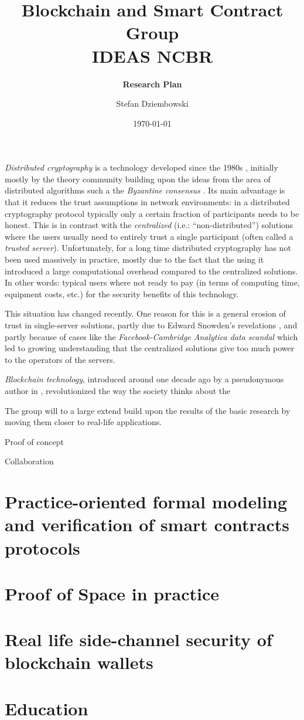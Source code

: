 \documentclass{article}
\title{\textbf{Blockchain and Smart Contract Group\\ IDEAS NCBR}}
\subtitle{\textbf{Research Plan}}
\date{\today}
\author{Stefan Dziembowski}
\begin{document}
	
\maketitle


\emph{Distributed cryptography} is a technology developed since the 1980s \cite{DBLP:conf/focs/Yao86,DBLP:conf/stoc/GoldreichMW87,DBLP:conf/crypto/ChaumCD87,DBLP:conf/stoc/Ben-OrGW88}, initially mostly by the theory community building upon the ideas from the area of distributed algorithms such a the \emph{Byzantine consensus} \cite{DBLP:journals/toplas/LamportSP82}. Its main advantage is that it reduces the trust assumptions in network environments: in a distributed cryptography protocol typically only a certain fraction of participants needs to be honest. This is in contrast with the \emph{centralized} (i.e.: ``non-distributed'') solutions where the users usually need to entirely trust a single participant (often called a \emph{trusted server}). Unfortunately, for a long time distributed cryptography has not been used  massively in practice, mostly due to the fact that the using it introduced a large computational overhead compared to the centralized solutions. In other words: typical users where not ready to pay (in terms of computing time, equipment costs, etc.) for the security benefits of this technology.

This situation has changed recently. One reason for this is a general erosion of trust in single-server solutions, partly due to Edward Snowden's revelations \cite{enwiki:1029775076}, and partly because of cases like the \emph{Facebook-Cambridge Analytica data scandal} \cite{enwiki:1029165846} which led to growing understanding that the centralized solutions give too much power to the operators of the servers.

 \emph{Blockchain technology}, introduced around one decade ago by a pseudonymous author in \cite{nakamoto2008bitcoin}, revolutionized the way the society thinks about the 

The group will to a large extend build upon the results of the basic research 
by moving them closer to real-life applications.

Proof of concept

Collaboration




\section{Practice-oriented formal modeling and verification of smart contracts protocols}

\section{Proof of Space in practice}

\section{Real life side-channel security of blockchain wallets}


\section{Education}



\printbibliography
\end{document}
